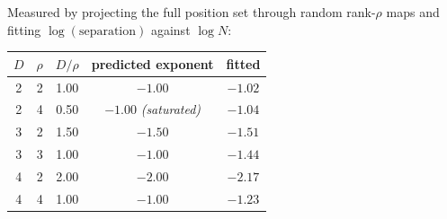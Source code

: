 \documentclass[11pt]{article}
\begin{document}
\noindent Measured by projecting the full position set through random rank-$\rho$
maps and fitting $\log(\text{separation})$ against $\log N$:

\begin{center}\small
\begin{tabular}{ccccc}
\toprule
$D$ & $\rho$ & $D/\rho$ & predicted exponent & fitted \\
\midrule
2 & 2 & 1.00 & $-1.00$ & $-1.02$ \\
2 & 4 & 0.50 & $-1.00$ \emph{(saturated)} & $-1.04$ \\
3 & 2 & 1.50 & $-1.50$ & $-1.51$ \\
3 & 3 & 1.00 & $-1.00$ & $-1.44$ \\
4 & 2 & 2.00 & $-2.00$ & $-2.17$ \\
4 & 4 & 1.00 & $-1.00$ & $-1.23$ \\
\bottomrule
\end{tabular}
\end{center}
\end{document}
